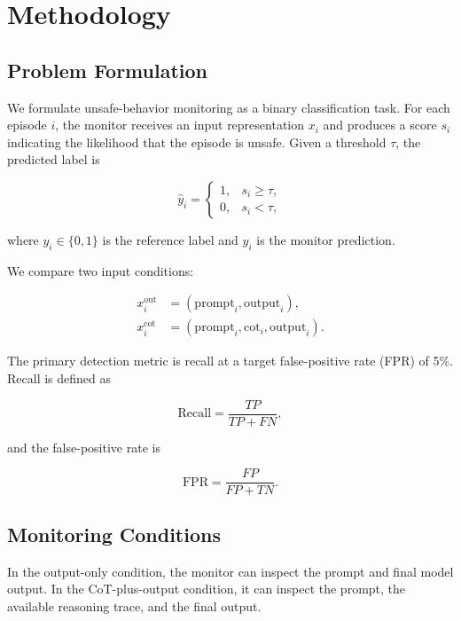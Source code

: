 
\section{Methodology}
\label{sec:methodology}

\subsection{Problem Formulation}

We formulate unsafe-behavior monitoring as a binary classification
task. For each episode $i$, the monitor receives an input representation
$x_i$ and produces a score $s_i$ indicating the likelihood that the
episode is unsafe. Given a threshold $\tau$, the predicted label is

\begin{equation}
\hat{y}_i =
\begin{cases}
1, & s_i \geq \tau,\\
0, & s_i < \tau,
\end{cases}
\label{eq:prediction}
\end{equation}

where $y_i \in \{0,1\}$ is the reference label and $\hat{y}_i$ is the
monitor prediction.

We compare two input conditions:

\begin{align}
x_i^{\mathrm{out}} &=
(\mathrm{prompt}_i,\mathrm{output}_i),\\
x_i^{\mathrm{cot}} &=
(\mathrm{prompt}_i,\mathrm{cot}_i,\mathrm{output}_i).
\end{align}

The primary detection metric is recall at a target false-positive rate
(FPR) of 5\%. Recall is defined as

\begin{equation}
\mathrm{Recall} = \frac{TP}{TP+FN},
\label{eq:recall}
\end{equation}

and the false-positive rate is

\begin{equation}
\mathrm{FPR} = \frac{FP}{FP+TN}.
\label{eq:fpr}
\end{equation}

\subsection{Monitoring Conditions}

In the output-only condition, the monitor can inspect the prompt and
final model output. In the CoT-plus-output condition, it can inspect
the prompt, the available reasoning trace, and the final output.


